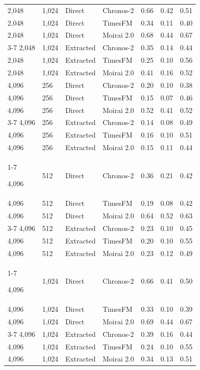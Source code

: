 \begin{longtable}{ll ll ccc}
2,048 & 1,024 & Direct & Chronos-2 & 0.66 & 0.42 & 0.51 \\
2,048 & 1,024 & Direct & TimesFM & 0.34 & 0.11 & 0.40 \\
2,048 & 1,024 & Direct & Moirai 2.0 & 0.68 & 0.44 & 0.67 \\
\cmidrule(lr){3-7}
2,048 & 1,024 & Extracted & Chronos-2 & 0.35 & 0.14 & 0.44 \\
2,048 & 1,024 & Extracted & TimesFM & 0.25 & 0.10 & 0.56 \\
2,048 & 1,024 & Extracted & Moirai 2.0 & 0.41 & 0.16 & 0.52 \\

\midrule

4,096 & 256 & Direct & Chronos-2 & 0.20 & 0.10 & 0.38 \\
4,096 & 256 & Direct & TimesFM & 0.15 & 0.07 & 0.46 \\
4,096 & 256 & Direct & Moirai 2.0 & 0.52 & 0.41 & 0.52 \\
\cmidrule(lr){3-7}
4,096 & 256 & Extracted & Chronos-2 & 0.14 & 0.08 & 0.49 \\
4,096 & 256 & Extracted & TimesFM & 0.16 & 0.10 & 0.51 \\
4,096 & 256 & Extracted & Moirai 2.0 & 0.15 & 0.11 & 0.44 \\
\cmidrule(lr){1-7}

4,096 & 512 & Direct & Chronos-2 & 0.36 & 0.21 & 0.42 \\
4,096 & 512 & Direct & TimesFM & 0.19 & 0.08 & 0.42 \\
4,096 & 512 & Direct & Moirai 2.0 & 0.64 & 0.52 & 0.63 \\
\cmidrule(lr){3-7}
4,096 & 512 & Extracted & Chronos-2 & 0.23 & 0.10 & 0.45 \\
4,096 & 512 & Extracted & TimesFM & 0.20 & 0.10 & 0.55 \\
4,096 & 512 & Extracted & Moirai 2.0 & 0.23 & 0.12 & 0.49 \\
\cmidrule(lr){1-7}

4,096 & 1,024 & Direct & Chronos-2 & 0.66 & 0.41 & 0.50 \\
4,096 & 1,024 & Direct & TimesFM & 0.33 & 0.10 & 0.39 \\
4,096 & 1,024 & Direct & Moirai 2.0 & 0.69 & 0.44 & 0.67 \\
\cmidrule(lr){3-7}
4,096 & 1,024 & Extracted & Chronos-2 & 0.39 & 0.16 & 0.44 \\
4,096 & 1,024 & Extracted & TimesFM & 0.24 & 0.10 & 0.55 \\
4,096 & 1,024 & Extracted & Moirai 2.0 & 0.34 & 0.13 & 0.51 \\


\end{longtable}
